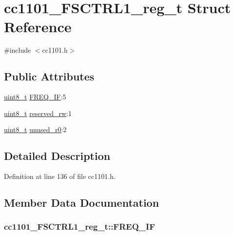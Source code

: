 \hypertarget{structcc1101___f_s_c_t_r_l1__reg__t}{}\section{cc1101\+\_\+\+F\+S\+C\+T\+R\+L1\+\_\+reg\+\_\+t Struct Reference}
\label{structcc1101___f_s_c_t_r_l1__reg__t}


{\ttfamily \#include $<$cc1101.\+h$>$}

\subsection*{Public Attributes}
\begin{DoxyCompactItemize}
\item 
\hyperlink{_p_e___types_8h_aba7bc1797add20fe3efdf37ced1182c5}{uint8\+\_\+t} \hyperlink{structcc1101___f_s_c_t_r_l1__reg__t_a12e785855acb37dd5fea7eb1796b8afd}{F\+R\+E\+Q\+\_\+\+IF}\+:5
\item 
\hyperlink{_p_e___types_8h_aba7bc1797add20fe3efdf37ced1182c5}{uint8\+\_\+t} \hyperlink{structcc1101___f_s_c_t_r_l1__reg__t_afd37250a51986607b49a8e6cd5477655}{reserved\+\_\+rw}\+:1
\item 
\hyperlink{_p_e___types_8h_aba7bc1797add20fe3efdf37ced1182c5}{uint8\+\_\+t} \hyperlink{structcc1101___f_s_c_t_r_l1__reg__t_a763c9a7160816113690d8fe2418cc921}{unused\+\_\+r0}\+:2
\end{DoxyCompactItemize}


\subsection{Detailed Description}


Definition at line 136 of file cc1101.\+h.



\subsection{Member Data Documentation}
\subsubsection[{\texorpdfstring{F\+R\+E\+Q\+\_\+\+IF}{FREQ_IF}}]{ cc1101\+\_\+\+F\+S\+C\+T\+R\+L1\+\_\+reg\+\_\+t\+::\+F\+R\+E\+Q\+\_\+\+IF}\hypertarget{structcc1101___f_s_c_t_r_l1__reg__t_a12e785855acb37dd5fea7eb1796b8afd}{}\label{structcc1101___f_s_c_t_r_l1__reg__t_a12e785855acb37dd5fea7eb1796b8afd}


